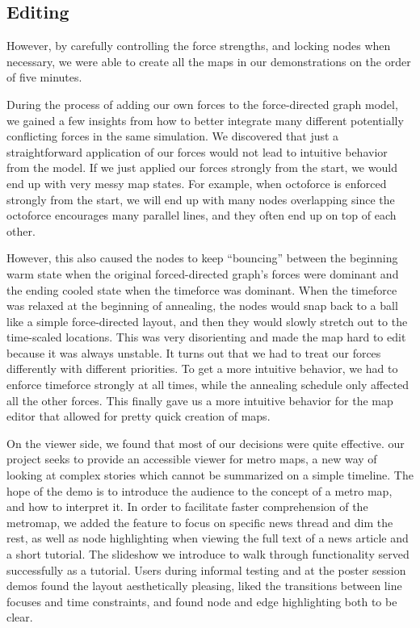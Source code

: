 \documentclass{chi2009}
\begin{document}
\subsection{Editing}

  However, by carefully controlling the force strengths, and locking nodes when necessary, we were able to create all the maps in our demonstrations on the order of five minutes. 


During the process of adding our own forces to the force-directed graph model, we gained a few insights from how to better integrate many different potentially conflicting forces in the same simulation.  We discovered that just a straightforward application of our forces would not lead to intuitive behavior from the model.  If we just applied our forces strongly from the start, we would end up with very messy map states.  For example, when octoforce is enforced strongly from the start, we will end up with many nodes overlapping since the octoforce encourages many parallel lines, and they often end up on top of each other.  


However, this also caused the nodes to keep “bouncing” between the beginning warm state when the original forced-directed graph’s forces were dominant and the ending cooled state when the timeforce was dominant.  When the timeforce was relaxed at the beginning of annealing, the nodes would snap back to a ball like a simple force-directed layout, and then they would slowly stretch out to the time-scaled locations.  This was very disorienting and made the map hard to edit because it was always unstable.  
    It turns out that we had to treat our forces differently with different priorities.  To get a more intuitive behavior, we had to enforce timeforce strongly at all times, while the annealing schedule only affected all the other forces.  This finally gave us a more intuitive behavior for the map editor that allowed for pretty quick creation of maps.  


On the viewer side, we found that most of our decisions were quite effective. our project seeks to provide an accessible viewer for metro maps, a new way of looking at complex stories which cannot be summarized on a simple timeline. The hope of the demo is to introduce the audience to the concept of a metro map, and how to interpret it.  In order to facilitate faster comprehension of the metromap, we added the feature to focus on specific news thread and dim the rest, as well as node highlighting when viewing the full text of a news article and a short tutorial.   The slideshow we introduce to walk through functionality served successfully as a tutorial. Users during informal testing and at the poster session demos found the layout aesthetically pleasing, liked the transitions between line focuses and time constraints, and found node and edge highlighting both to be clear.
\end{document}
